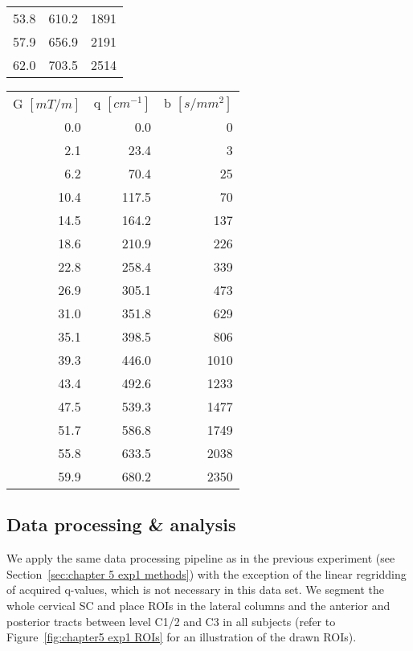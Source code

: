 \begin{table}
{\begin{tabular}{rrr}
                53.8  & 610.2 & 1891 \\
                57.9  & 656.9 & 2191 \\
                62.0  & 703.5 & 2514 \\
                \bottomrule
            \end{tabular}%
            \hspace{0.2cm}%
            \begin{tabular}{rrr}
            \addlinespace
                \multicolumn{3}{l}{\textit{... continued}}\\
            \toprule
                G $[mT/m]$ & q $[cm^{-1}]$ & b $[s/mm^2]$ \\
                \cmidrule(r){1-1}\cmidrule(lr){2-2}\cmidrule(l){3-3}
                0.0   & 0.0   & 0 \\
                2.1   & 23.4  & 3 \\
                6.2   & 70.4  & 25 \\
                10.4  & 117.5 & 70 \\
                14.5  & 164.2 & 137 \\
                18.6  & 210.9 & 226 \\
                22.8  & 258.4 & 339 \\
                26.9  & 305.1 & 473 \\
                31.0  & 351.8 & 629 \\
                35.1  & 398.5 & 806 \\
                39.3  & 446.0 & 1010 \\
                43.4  & 492.6 & 1233 \\
                47.5  & 539.3 & 1477 \\
                51.7  & 586.8 & 1749 \\
                55.8  & 633.5 & 2038 \\
                59.9  & 680.2 & 2350 \\
                \bottomrule
            \end{tabular}%
     }
     \label{tab:chapter6 QSI protocol}
\end{table}



\subsection*{Data processing \& analysis}
We apply the same data processing pipeline as in the previous experiment (see Section~\ref{sec:chapter 5 exp1 methods}) with the exception of the linear regridding of acquired q-values, which is not necessary in this data set. We segment the whole cervical {\gls{SC}} and place \glspl{ROI} in the lateral columns and the anterior and posterior tracts between level C1/2 and C3 in all subjects (refer to Figure~\ref{fig:chapter5 exp1 ROIs} for an illustration of the drawn ROIs).

